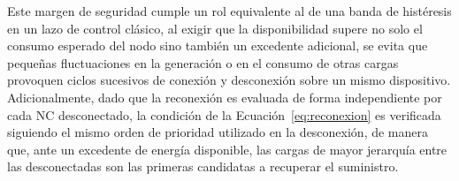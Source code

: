 Este margen de seguridad cumple un rol equivalente al de una banda de histéresis en un lazo de control clásico, al exigir que la disponibilidad supere no solo el consumo esperado del nodo sino también un excedente adicional, se evita que pequeñas fluctuaciones en la generación o en el consumo de otras cargas provoquen ciclos sucesivos de conexión y desconexión sobre un mismo dispositivo. Adicionalmente, dado que la reconexión es evaluada de forma independiente por cada NC desconectado, la condición de la Ecuación~\ref{eq:reconexion} es verificada siguiendo el mismo orden de prioridad utilizado en la desconexión, de manera que, ante un excedente de energía disponible, las cargas de mayor jerarquía entre las desconectadas son las primeras candidatas a recuperar el suministro.